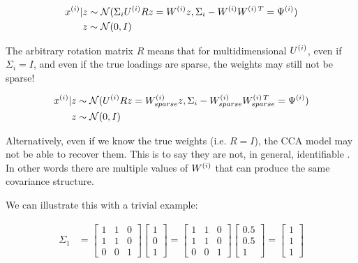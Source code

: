 \begin{align}
    x^{(i)} | z &\sim \mathcal{N}(\Sigma_{i}U^{(i)}R z=W^{(i)}z, \Sigma_{i}-W^{(i)}W^{(i)\,T}=\Psi^{(i)}) \\
    z &\sim \mathcal{N}(0, I)
\end{align}

The arbitrary rotation matrix \(R\) means that for multidimensional $U^{(i)}$, even if $\Sigma_{i}=I$, and even if the true loadings are sparse, the weights may still not be sparse!

\begin{align}
    x^{(i)} | z &\sim \mathcal{N}(U^{(i)}R z=W_{sparse}^{(i)}z, \Sigma_{i}-W_{sparse}^{(i)}W_{sparse}^{(i)\,T}=\Psi^{(i)}) \\
    z &\sim \mathcal{N}(0, I)
\end{align}

Alternatively, even if we know the true weights (i.e. $R=I$), the CCA model may not be able to recover them.
This is to say they are not, in general, identifiable \citep{park2023critical}.
In other words there are multiple values of $W^{(i)}$ that can produce the same covariance structure.

We can illustrate this with a trivial example:

\begin{align}
    \Sigma_{1} &= \begin{bmatrix}
                         1 & 1 & 0 \\
                         1 & 1 & 0 \\
                         0 & 0 & 1
    \end{bmatrix}\begin{bmatrix}
                     1 \\
                     0 \\
                     1
    \end{bmatrix}=
    \begin{bmatrix}
        1 & 1 & 0 \\
        1 & 1 & 0 \\
        0 & 0 & 1
    \end{bmatrix}\begin{bmatrix}
                     0.5 \\
                     0.5 \\
                     1
    \end{bmatrix}= \begin{bmatrix}
                        1 \\
                        1 \\
                        1
    \end{bmatrix} \\
\end{align}

